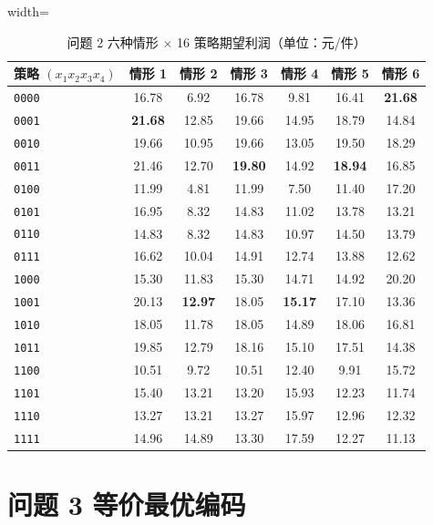 \documentclass[withoutpreface,bwprint]{cumcmthesis}
\begin{document}
\begin{appendices}
\begin{table}[htbp]
\centering
\caption{问题 2 六种情形 $\times$ 16 策略期望利润（单位：元/件）}
\label{app:tab-q2-all}
\small
\begin{adjustbox}{width=\textwidth}
\begin{tabular}{@{}lcccccc@{}}
\toprule[1.5pt]
策略 $(x_1x_2x_3x_4)$ & 情形 1 & 情形 2 & 情形 3 & 情形 4 & 情形 5 & 情形 6 \\
\midrule[1pt]
\texttt{0000} & 16.78 & 6.92  & 16.78 & 9.81  & 16.41 & \textbf{21.68} \\
\texttt{0001} & \textbf{21.68} & 12.85 & 19.66 & 14.95 & 18.79 & 14.84 \\
\texttt{0010} & 19.66 & 10.95 & 19.66 & 13.05 & 19.50 & 18.29 \\
\texttt{0011} & 21.46 & 12.70 & \textbf{19.80} & 14.92 & \textbf{18.94} & 16.85 \\
\texttt{0100} & 11.99 & 4.81  & 11.99 & 7.50  & 11.40 & 17.20 \\
\texttt{0101} & 16.95 & 8.32  & 14.83 & 11.02 & 13.78 & 13.21 \\
\texttt{0110} & 14.83 & 8.32  & 14.83 & 10.97 & 14.50 & 13.79 \\
\texttt{0111} & 16.62 & 10.04 & 14.91 & 12.74 & 13.88 & 12.62 \\
\texttt{1000} & 15.30 & 11.83 & 15.30 & 14.71 & 14.92 & 20.20 \\
\texttt{1001} & 20.13 & \textbf{12.97} & 18.05 & \textbf{15.17} & 17.10 & 13.36 \\
\texttt{1010} & 18.05 & 11.78 & 18.05 & 14.89 & 18.06 & 16.81 \\
\texttt{1011} & 19.85 & 12.79 & 18.16 & 15.10 & 17.51 & 14.38 \\
\texttt{1100} & 10.51 & 9.72  & 10.51 & 12.40 & 9.91  & 15.72 \\
\texttt{1101} & 15.40 & 13.21 & 13.20 & 15.93 & 12.23 & 11.74 \\
\texttt{1110} & 13.27 & 13.21 & 13.27 & 15.97 & 12.96 & 12.32 \\
\texttt{1111} & 14.96 & 14.89 & 13.30 & 17.59 & 12.27 & 11.13 \\
\bottomrule[1.5pt]
\end{tabular}
\end{adjustbox}
\end{table}

\clearpage

\section{问题 3 等价最优编码}


\end{appendices}
\end{document}
